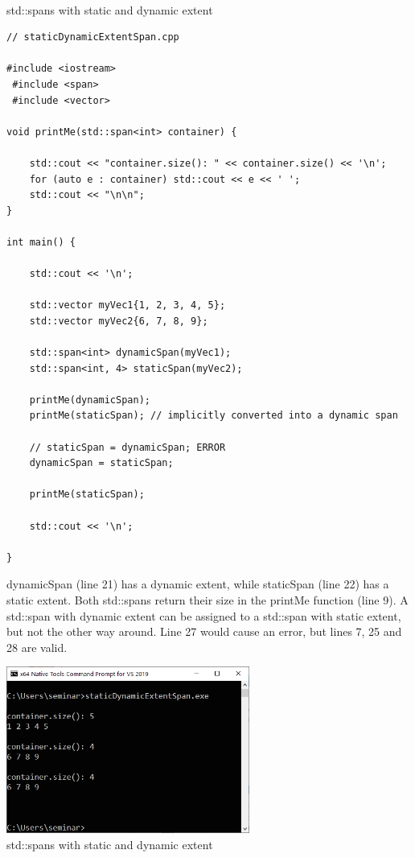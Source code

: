 \hspace*{\fill} \\ %
\noindent
std::spans with static and dynamic extent
\begin{lstlisting}[style=styleCXX]
// staticDynamicExtentSpan.cpp

#include <iostream>
 #include <span>
 #include <vector>

void printMe(std::span<int> container) {
	
	std::cout << "container.size(): " << container.size() << '\n';
	for (auto e : container) std::cout << e << ' ';
	std::cout << "\n\n";
}

int main() {

	std::cout << '\n';
	
	std::vector myVec1{1, 2, 3, 4, 5};
	std::vector myVec2{6, 7, 8, 9};
	
	std::span<int> dynamicSpan(myVec1);
	std::span<int, 4> staticSpan(myVec2);
	
	printMe(dynamicSpan);
	printMe(staticSpan); // implicitly converted into a dynamic span
	
	// staticSpan = dynamicSpan; ERROR
	dynamicSpan = staticSpan;
	
	printMe(staticSpan);
	
	std::cout << '\n';

}
\end{lstlisting}

dynamicSpan (line 21) has a dynamic extent, while staticSpan (line 22) has a static extent. Both std::spans return their size in the printMe function (line 9). A std::span with dynamic extent can be assigned to a std::span with static extent, but not the other way around. Line 27 would cause an error, but lines 7, 25 and 28 are valid.

\begin{center}
\includegraphics[width=0.6\textwidth]{content/3/chapter5/images/4.png}\\
std::spans with static and dynamic extent
\end{center}

